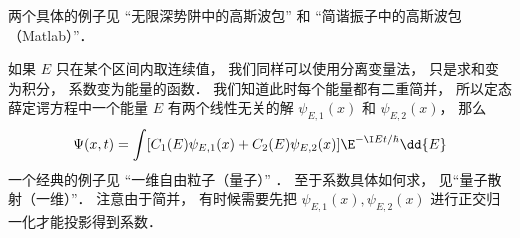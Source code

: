 两个具体的例子见 “无限深势阱中的高斯波包” 和 “简谐振子中的高斯波包（Matlab）”．

如果 $E$ 只在某个区间内取连续值， 我们同样可以使用分离变量法， 只是求和变为积分， 系数变为能量的函数． 我们知道此时每个能量都有二重简并， 所以定态薛定谔方程中一个能量 $E$ 有两个线性无关的解 $\psi_{E,1}(x)$ 和 $\psi_{E,2}(x)$， 那么
\begin{equation}\label{TDSE11_eq4}
\Psi(x, t) = \int [C_1(E) \psi_{E,1}(x) + C_2(E) \psi_{E,2}(x)] \E^{-\I E t/\hbar} \dd{E}
\end{equation}
一个经典的例子见 “一维自由粒子（量子）” ． 至于系数具体如何求， 见“量子散射（一维）”． 注意由于简并， 有时候需要先把 $\psi_{E,1}(x), \psi_{E,2}(x)$ 进行正交归一化才能投影得到系数．
